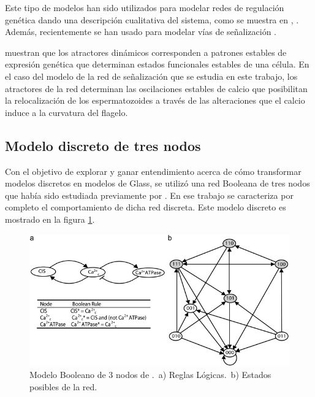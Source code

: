 Este tipo de modelos han sido utilizados para modelar redes de regulación genética dando una descripción cualitativa del sistema, como se muestra en \citeauthor{EspinosaSoto:2004jr} \citep{EspinosaSoto:2004jr}, \citeauthor{Albert:2003vx} \citep{Albert:2003vx}. Además, recientemente se han usado para modelar vías de señalización \citeauthor{Morris:2010gb} \citep{Morris:2010gb}.


\citeauthor{huang2005} \citep{huang2005} muestran que los atractores din\'amicos corresponden a patrones estables de expresi\'on gen\'etica que determinan estados funcionales estables de una c\'elula. En el caso del modelo de la red de se\~nalizaci\'on que se estudia en este trabajo, los atractores de la red determinan las oscilaciones estables de calcio que posibilitan la relocalizaci\'on de los espermatozoides a trav\'es de las alteraciones que el calcio induce a la curvatura del flagelo.

\subsection{Modelo discreto de tres nodos}\label{sect:3nodos}


Con el objetivo de explorar y ganar entendimiento acerca de cómo transformar modelos discretos en modelos de Glass, se utilizó una red Booleana de tres nodos que había sido estudiada previamente por \citeauthor{Reka3Nodos2010}. En ese trabajo se caracteriza por completo el comportamiento de dicha red discreta. Este modelo discreto es mostrado en la figura \ref{fig:red3reka}.

\begin{figure}[hbt]
\includegraphics[width=0.9\linewidth]{gfx/red3nodos}
\caption[Modelo Booleano de 3 nodos]{Modelo Booleano de 3 nodos de \citeauthor{Reka3Nodos2010} \citep{Reka3Nodos2010}.\ a) Reglas L\'ogicas.\ b) Estados posibles de la red.}\label{fig:red3reka}
\end{figure}


